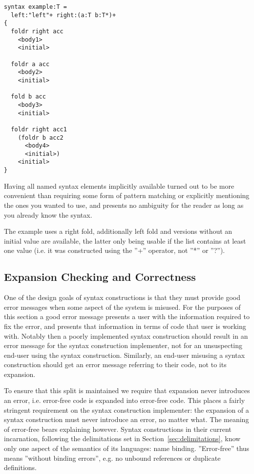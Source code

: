 \documentclass{kththesis}
\begin{document}
\begin{verbatim}
syntax example:T =
  left:"left"+ right:(a:T b:T*)+
{
  foldr right acc
    <body1>
    <initial>

  foldr a acc
    <body2>
    <initial>

  fold b acc
    <body3>
    <initial>

  foldr right acc1
    (foldr b acc2
      <body4>
      <initial>)
    <initial>
}
\end{verbatim}

Having all named syntax elements implicitly available turned out to be more convenient than requiring some form of pattern matching or explicitly mentioning the ones you wanted to use, and presents no ambiguity for the reader as long as you already know the syntax.

The example uses a right fold, additionally left fold and versions without an initial value are available, the latter only being usable if the list contains at least one value (i.e. it was constructed using the ''+'' operator, not ''*'' or ''?'').

\subsection{Expansion Checking and Correctness} \label{sec:expansion-checking}

One of the design goals of syntax constructions is that they must provide good error messages when some aspect of the system is misused. For the purposes of this section a good error message presents a user with the information required to fix the error, and presents that information in terms of code that user is working with. Notably then a poorly implemented syntax construction should result in an error message for the syntax construction implementer, not for an unsuspecting end-user using the syntax construction. Similarly, an end-user misusing a syntax construction should get an error message referring to their code, not to its expansion.

To ensure that this split is maintained we require that expansion never introduces an error, i.e. error-free code is expanded into error-free code. This places a fairly stringent requirement on the syntax construction implementer: the expansion of a syntax construction must never introduce an error, no matter what. The meaning of error-free bears explaining however. Syntax constructions in their current incarnation, following the delimitations set in Section~\ref{sec:delimitations}, know only one aspect of the semantics of its languages: name binding. ''Error-free'' thus means ''without binding errors'', e.g. no unbound references or duplicate definitions.
\end{document}
